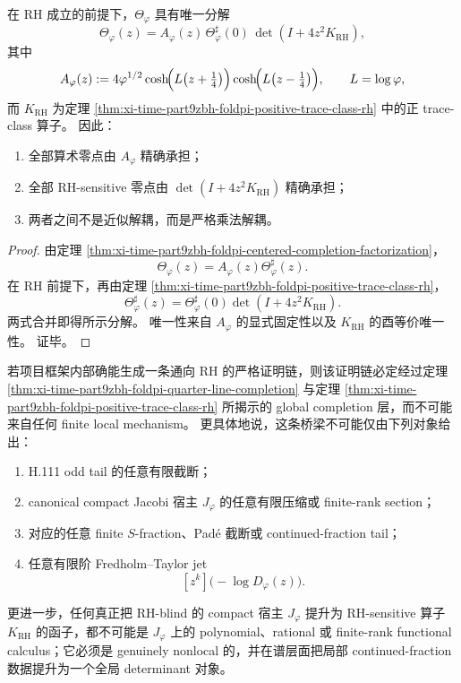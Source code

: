 \begin{theorem}\label{thm:xi-time-part9zbh-foldpi-arithmetic-spectral-decoupling}
在 RH 成立的前提下，\(\Theta_\varphi\) 具有唯一分解
\[
\Theta_\varphi(z)
=
A_\varphi(z)\,
\Theta_\varphi^\sharp(0)\,
\det(I+4z^2K_{\mathrm{RH}}),
\]
其中
\[
A_\varphi(z)
:=
4\varphi^{1/2}
\cosh\!\Bigl(L\bigl(z+\tfrac14\bigr)\Bigr)
\cosh\!\Bigl(L\bigl(z-\tfrac14\bigr)\Bigr),
\qquad
L=\log\varphi,
\]
而 \(K_{\mathrm{RH}}\) 为定理 \ref{thm:xi-time-part9zbh-foldpi-positive-trace-class-rh} 中的正 trace-class 算子。
因此：
\begin{enumerate}
  \item 全部算术零点由 \(A_\varphi\) 精确承担；
  \item 全部 RH-sensitive 零点由 \(\det(I+4z^2K_{\mathrm{RH}})\) 精确承担；
  \item 两者之间不是近似解耦，而是严格乘法解耦。
\end{enumerate}
\end{theorem}
\begin{proof}
由定理 \ref{thm:xi-time-part9zbh-foldpi-centered-completion-factorization}，
\[
\Theta_\varphi(z)=A_\varphi(z)\Theta_\varphi^\sharp(z).
\]
在 RH 前提下，再由定理 \ref{thm:xi-time-part9zbh-foldpi-positive-trace-class-rh}，
\[
\Theta_\varphi^\sharp(z)
=
\Theta_\varphi^\sharp(0)\det(I+4z^2K_{\mathrm{RH}}).
\]
两式合并即得所示分解。
唯一性来自 \(A_\varphi\) 的显式固定性以及 \(K_{\mathrm{RH}}\) 的酉等价唯一性。
证毕。
\end{proof}

\begin{conjecture}\label{conj:xi-time-part9zbh-foldpi-nonlocal-bridge-rh}
若项目框架内部确能生成一条通向 RH 的严格证明链，则该证明链必定经过定理 \ref{thm:xi-time-part9zbh-foldpi-quarter-line-completion} 与定理 \ref{thm:xi-time-part9zbh-foldpi-positive-trace-class-rh} 所揭示的 global completion 层，而不可能来自任何 finite local mechanism。
更具体地说，这条桥梁不可能仅由下列对象给出：
\begin{enumerate}
  \item H.111 odd tail 的任意有限截断；
  \item canonical compact Jacobi 宿主 \(J_\varphi\) 的任意有限压缩或 finite-rank section；
  \item 对应的任意 finite \(S\)-fraction、Pad\'e 截断或 continued-fraction tail；
  \item 任意有限阶 Fredholm--Taylor jet
  \[
  [z^k]\bigl(-\log D_\varphi(z)\bigr).
  \]
\end{enumerate}
更进一步，任何真正把 RH-blind 的 compact 宿主 \(J_\varphi\) 提升为 RH-sensitive 算子 \(K_{\mathrm{RH}}\) 的函子，都不可能是 \(J_\varphi\) 上的 polynomial、rational 或 finite-rank functional calculus；它必须是 genuinely nonlocal 的，并在谱层面把局部 continued-fraction 数据提升为一个全局 determinant 对象。
\end{conjecture}

